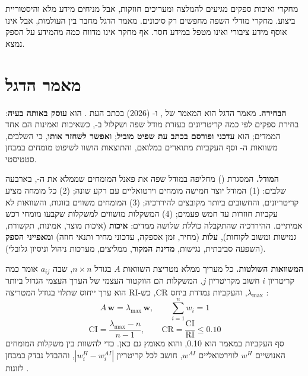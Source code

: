 מחקרי  ואיכות ספקים מגיעים להמלצה ומעריכים חוזקות, אבל מניחים מידע מלא והיסטוריית ביצוע. מחקרי מודלי השפה מחפשים רק סיכונים. מאמר הדגל מחבר בין העולמות, אבל אינו אוסף מידע ציבורי ואינו מטפל במידע חסר. אף מחקר אינו מדווח כמה מהמידע על הספק נמצא.

\section{מאמר הדגל}\label{sec:flagship}

\textbf{הבחירה.} מאמר הדגל הוא המאמר של ,  ו- (2026) בכתב העת  \cite{sadeghi2026}. הוא \textbf{עוסק באותה בעיה}: בחירת ספקים לפי כמה קריטריונים בעזרת מודל שפה ושקלול ב-, כשאיכות ואמינות הם אחד הממדים; הוא \textbf{עדכני ופורסם בכתב עת שפיט מוביל}; ו\textbf{אפשר לשחזר אותו}, כי השלבים, משוואות ה- וסף העקביות מתוארים במלואם, והתוצאות הושוו לשיפוט מומחים במבחן סטטיסטי.

\textbf{המודל.} המסגרת  () מחליפה במודל שפה את פאנל המומחים שממלא את ה-, בארבעה שלבים: (1) המודל יוצר חמישה מומחים וירטואליים עם רקע שונה; (2) כל מומחה מציע קריטריונים, והחשובים ביותר מקובצים להיררכיה; (3) המומחים משווים בזוגות, והשוואות לא עקביות חוזרות עד חמש פעמים; (4) המשקלות מושווים למשקלות שקבעו מומחי רכש אמיתיים. ההיררכיה שהתקבלה כוללת שלושה ממדים: \textbf{איכות} (איכות מוצר, אמינות, תקשורת, גמישות ומשוב לקוחות), \textbf{עלות} (מחיר, זמן אספקה, עדכוני מחיר ותנאי חוזה) ו\textbf{מאפייני הספק} (השפעה סביבתית, נגישות, \textbf{מדינת המקור}, ממליצים, מערכות ניהול וניסיון גלובלי).

\textbf{המשוואות השולטות.} כל מעריך ממלא מטריצת השוואות $A$ בגודל $n\times n$, שבה $a_{ij}$ אומר כמה קריטריון $i$ חשוב מקריטריון $j$. המשקלות הם הווקטור העצמי של הערך העצמי הגדול ביותר $\lambda_{\max}$, והעקביות נמדדת ביחס $\mathrm{CR}$, כש-$\mathrm{RI}$ הוא ערך ייחוס שתלוי בגודל המטריצה \cite{saaty1990}:
\begin{equation}\label{eq:ahp}
A\,\mathbf{w}=\lambda_{\max}\,\mathbf{w},\qquad \sum_{i=1}^{n} w_i = 1
\end{equation}
\begin{equation}\label{eq:cr}
\mathrm{CI}=\frac{\lambda_{\max}-n}{n-1},\qquad
\mathrm{CR}=\frac{\mathrm{CI}}{\mathrm{RI}}\le 0.10
\end{equation}
סף העקביות במאמר הוא 0.10, והוא מאומץ גם כאן. כדי להשוות בין משקלות המומחים האנושיים $w^{H}$ לווירטואליים $w^{AI}$, חושב לכל קריטריון $|w^{H}_i-w^{AI}_i|$, וההבדל נבדק במבחן  לזוגות \cite{sadeghi2026}.

